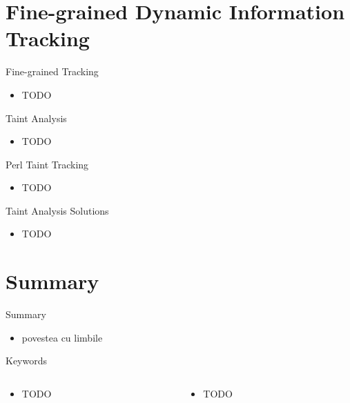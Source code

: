 \documentclass{curs}
\begin{document}
\section{Fine-grained Dynamic Information Tracking}

\begin{frame}{Fine-grained Tracking}
  \begin{itemize}
    \item TODO
  \end{itemize}
\end{frame}

\begin{frame}{Taint Analysis}
  \begin{itemize}
    \item TODO
  \end{itemize}
\end{frame}

\begin{frame}{Perl Taint Tracking}
  \begin{itemize}
    \item TODO
  \end{itemize}
\end{frame}

\begin{frame}{Taint Analysis Solutions}
  \begin{itemize}
    \item TODO
  \end{itemize}
\end{frame}

\section{Summary}

\begin{frame}{Summary}
  \begin{itemize}
    \item povestea cu limbile
  \end{itemize}
\end{frame}

\begin{frame}{Keywords}
  \begin{columns}
    \begin{column}{0.5\textwidth}
      \begin{itemize}
        \item TODO
      \end{itemize}
    \end{column}
    \begin{column}{0.5\textwidth}
      \begin{itemize}
        \item TODO
      \end{itemize}
    \end{column}
  \end{columns}
\end{frame}
\end{document}
